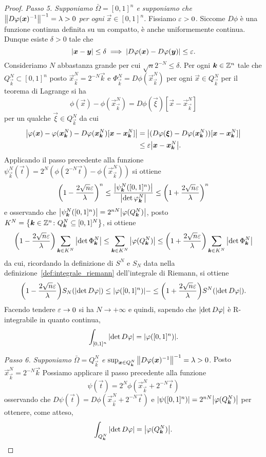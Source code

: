 \begin{proof}
\emph{Passo 5. Supponiamo $\bar \Omega=[0,1]^n$
e supponiamo che ${\left\Vert D\varphi(\boldsymbol x)^{-1}\right\Vert}^{-1}=\lambda>0$
per ogni $\vec x \in [0,1]^n$.}
Fissiamo $\varepsilon>0$.
Siccome $D\phi$ è una funzione continua definita su un compatto,
è anche uniformemente continua.
Dunque esiste $\delta>0$ tale che 
\[
 {\left|\boldsymbol x - \boldsymbol y\right|} \le \delta \implies
 {\left|D\varphi(\boldsymbol x)-D\varphi(\boldsymbol y)\right|} \le \varepsilon.
\]
Consideriamo $N$ abbastanza grande per cui $\sqrt n 2^{-N} \le \delta$.
Per ogni $\boldsymbol k\in {\mathbb Z}^n$ tale che $Q^N_{\vec k}\subset [0,1]^n$
posto $\vec x^N_{\vec k} = 2^{-N} \vec k$
e $\Phi^N_{\vec k}=D\phi(\vec x^N_{\vec k})$
per ogni $\vec x \in Q^N_{\vec k}$
per il teorema di Lagrange si ha 
\[
 \phi(\vec x)-\phi(\vec x^N_{\vec k}) 
 = D\phi(\vec \xi)[\vec x-\vec x^N_{\vec k}]
\]
per un qualche $\vec \xi \in Q^N_{\vec k}$ da cui 
\begin{align*}
{\left|\varphi(\boldsymbol x) - \varphi(\boldsymbol x^N_{\boldsymbol k})-D\varphi(\boldsymbol x^N_{\boldsymbol k})[\boldsymbol x-\boldsymbol x^N_{\boldsymbol k}]\right|}
& = {\left|(D\varphi(\boldsymbol \xi)-D\varphi(\boldsymbol x^N_{\boldsymbol k}))[\boldsymbol x - \boldsymbol x^N_{\boldsymbol k}]\right|} \\
& \le \varepsilon {\left|\boldsymbol x - \boldsymbol x^N_{\boldsymbol k}\right|}. 
\end{align*}
Applicando il passo precedente alla funzione $\psi^N_{\vec k}(\vec t) = 2^N (\phi(2^{-N}\vec t)-\phi(\vec x^N_{\vec k}))$
si ottiene 
\[
    {\left( 1-\frac{2\sqrt n\varepsilon}{\lambda} \right)}^n
    \le \frac{{\left|\psi^N_{\boldsymbol k}([0,1]^n)\right|}}{{\left|\det \varphi^N_{\boldsymbol k}\right|}} 
    \le {\left( 1+\frac{2\sqrt n\varepsilon}{\lambda} \right)}^n
\]
e osservando che ${\left|\psi^N_{\boldsymbol k}([0,1]^n)\right|} = 2^{nN} {\left|\varphi(Q^N_{\boldsymbol k})\right|}$,
posto $K^N={\left\{ \boldsymbol k\in {\mathbb Z}^n\colon Q^N_{\boldsymbol k}\subseteq [0,1]^N \right\}}$,
si ottiene
\[
   {\left( 1-\frac{2\sqrt n \varepsilon}{\lambda} \right)} \sum_{\boldsymbol k \in K^N} {\left|\det \Phi^N_{\boldsymbol k}\right|}
   \le \sum_{\boldsymbol k\in K^N} {\left|\varphi(Q^N_{\boldsymbol k})\right|}
   \le {\left( 1+\frac{2\sqrt n \varepsilon}{\lambda} \right)} \sum_{\boldsymbol k\in K^N} {\left|\det \Phi^N_{\boldsymbol k}\right|}
\]
da cui, ricordando la definizione di $S^N$ e $S_N$ data nella 
definizione~\ref{def:integrale_riemann} dell'integrale di Riemann,
si ottiene
\[
   {\left( 1-\frac{2\sqrt n \varepsilon}{\lambda} \right)} S_N({\left|\det D\varphi\right|})
   \le {\left|\varphi([0,1]^n)\right|}
-   \le {\left( 1+\frac{2\sqrt n \varepsilon}{\lambda} \right)} S^N({\left|\det D\varphi\right|}). 
\]
Facendo tendere $\varepsilon\to 0$ si ha $N\to+\infty$ e quindi,
sapendo che ${\left|\det D\varphi\right|}$ è R-integrabile in quanto continua,
\[
  \int_{[0,1]^n} {\left|\det D\varphi\right|} = {\left|\varphi([0,1]^n)\right|}.
\]

\emph{Passo 6. Supponiamo $\bar \Omega = Q^N_{\vec k}$ e 
$\sup_{\boldsymbol x \in Q^N_{\boldsymbol k}} {\left\Vert D\varphi(\boldsymbol x)^{-1}\right\Vert}^{-1}=\lambda>0$.}
Posto $\vec x^N_{\vec k} = 2^{-N}\vec k$
Possiamo applicare il passo precedente alla funzione 
\[
  \psi(\vec t) = 2^N\phi(\vec x^N_{\vec k}+2^{-N}\vec t)
\]
osservando che $D\psi(\vec t) = D\phi(\vec x^N_{\vec k}+2^{-N}\vec t)$
e ${\left|\psi([0,1]^n)\right|} = 2^{nN}{\left|\varphi(Q^N_{\boldsymbol k})\right|}$ per ottenere,
come atteso,
\[
   \int_{Q^N_{\boldsymbol k}} {\left|\det D\varphi\right|} = {\left|\varphi(Q^N_{\boldsymbol k})\right|}.
\]


\end{proof}
